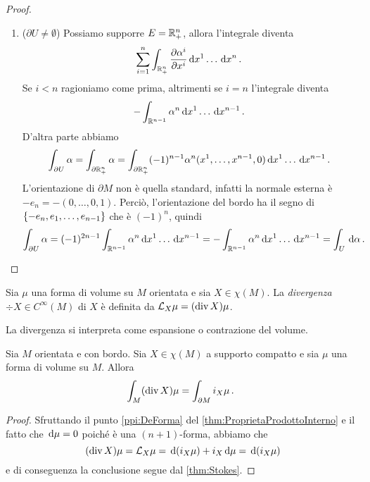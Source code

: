\begin{proof}
\begin{enumerate}
		\item ($\partial U \not = \emptyset$) Possiamo supporre $E=\R^n_+$, allora l'integrale diventa
		\begin{equation*}
			\sum_{i=1}^n \int_{\R^n_+} \DerParz{\alpha^i}{x^i} \seqa {\de x}{n}{} \punto
		\end{equation*}
		Se $i<n$ ragioniamo come prima, altrimenti se $i=n$ l'integrale diventa
		\begin{equation*}
			- \int_{\R^{n-1}} \alpha^n \seqa {\de x}{n-1}{} \punto
		\end{equation*}
		D'altra parte abbiamo
		\begin{equation*}
			\int_{\partial U}\alpha = \int_{\partial \R^n_+} \alpha = \int_{\partial \R^n_+} (-1)^{n-1} \alpha^n(\seqa x{n-1}, ,0) \seqa {\de x}{n-1}{} \punto
		\end{equation*}
		L'orientazione di $\partial M$ non è quella standard, infatti la normale esterna è $-e_n = -(0,\ldots,0,1)$. Perciò, l'orientazione del bordo ha il segno di $\{-e_n, \seqb e{n-1},\}$ che è  $(-1)^n$, quindi
		\begin{equation*}
			\int_{\partial U}\alpha = (-1)^{2n-1} \int_{\R^{n-1}} \alpha^n \seqa{\de x}{n-1}{} = - \int_{\R^{n-1}} \alpha^n \seqa {\de x}{n-1}{} = \int_U\de \alpha \punto
		\end{equation*}


	\end{enumerate}


\end{proof}


\begin{definition} 
	Sia $\mu$ una forma di volume su $M$ orientata e sia $X\in \chi(M)$. La \emph{divergenza} $\div X \in C^\infty(M)$ di $X$ è definita da $\Lie_X\mu = (\div X)\mu$.
\end{definition}

La divergenza si interpreta come espansione o contrazione del volume.

\begin{theorem} [Gauss]\label{thm:Gauss} 
	Sia $M$ orientata e con bordo. Sia $X\in\chi(M)$ a supporto compatto e sia $\mu$ una forma di volume su $M$. Allora
	\begin{equation*}
		\int_M (\div X) \mu = \int_{\partial M} i_X \mu \punto
	\end{equation*}
\end{theorem}
\begin{proof}
	Sfruttando il punto \ref{ppi:DeForma} del \cref{thm:ProprietaProdottoInterno} e il fatto che $\de \mu =0$ poiché è una $(n+1)$-forma, abbiamo che
	\begin{equation*}
		(\div X) \mu = \Lie_X \mu = \de (i_X \mu) + i_X \de \mu = \de (i_X \mu)
	\end{equation*}
	e di conseguenza la conclusione segue dal \cref{thm:Stokes}.
\end{proof}


